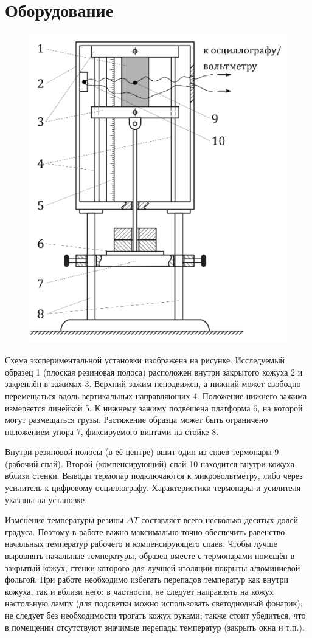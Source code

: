 \section{Оборудование}
\begin{figure}[ht!]
    \centering\includegraphics[width=0.8\linewidth]{img/kal.png}
\end{figure}

Схема экспериментальной установки изображена на рисунке. Исследуемый образец 1
(плоская резиновая полоса) расположен внутри закрытого кожуха 2 и закреплён в зажимах 3. 
Верхний зажим неподвижен, а нижний может свободно перемещаться вдоль вертикальных
направляющих 4. Положение нижнего зажима измеряется линейкой 5. К нижнему зажиму подвешена
платформа 6, на которой могут размещаться грузы. Растяжение образца может быть ограничено
положением упора 7, фиксируемого винтами на стойке 8.

Внутри резиновой полосы (в её центре) вшит один из спаев термопары 9 (рабочий спай).
Второй (компенсирующий) спай 10 находится внутри кожуха вблизи стенки. Выводы термопар
подключаются к микровольтметру, либо через усилитель к цифровому осциллографу.
Характеристики термопары и усилителя указаны на установке.

Изменение температуры резины $\Delta T$ составляет всего несколько десятых долей градуса.
Поэтому в работе важно максимально
точно обеспечить равенство начальных температур рабочего и компенсирующего спаев.
Чтобы лучше выровнять начальные температуры, образец вместе
с термопарами помещён в закрытый кожух, стенки которого для лучшей изоляции покрыты
алюминиевой фольгой. При работе необходимо избегать перепадов температур
как внутри кожуха, так и вблизи него: в частности, не
следует направлять на кожух настольную лампу (для подсветки можно использовать
светодиодный фонарик); не следует без необходимости трогать кожух руками; также стоит
убедиться, что в помещении отсутствуют значимые
перепады температур (закрыть окна и т.п.).

